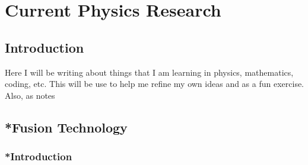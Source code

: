 \chapter{Current Physics Research}
\section{Introduction}
\par Here I will be writing about things that I am learning in physics, mathematics, coding, etc. This will be use to help me refine my own ideas and as a fun exercise. Also, as notes
\section{*Fusion Technology}
\subsection{*Introduction}

